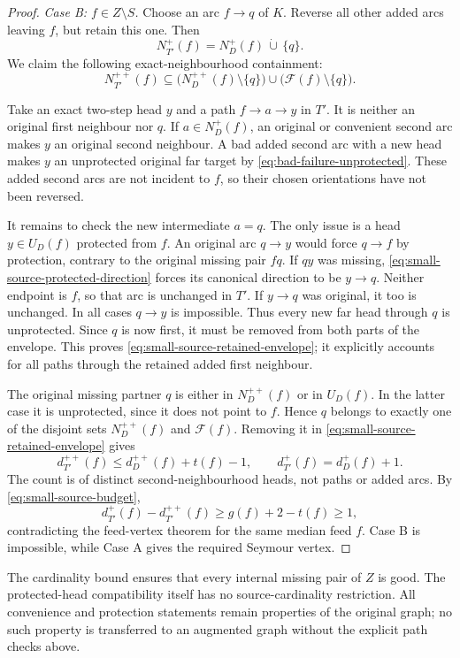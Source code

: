 \begin{proof}
\emph{Case B: $f\in Z\setminus S$.}
Choose an arc $f\to q$ of $K$. Reverse all other added arcs leaving
$f$, but retain this one. Then
\[
 N_{T'}^+(f)=N_D^+(f)\,\dot\cup\,\{q\}.
 \tag{SF4}\label{eq:small-source-retained-first}
\]
We claim the following exact-neighbourhood containment:
\[
 N_{T'}^{++}(f)
 \subseteq
 \bigl(N_D^{++}(f)\setminus\{q\}\bigr)
 \cup\bigl(\mathcal F(f)\setminus\{q\}\bigr).
 \tag{SF5}\label{eq:small-source-retained-envelope}
\]

Take an exact two-step head $y$ and a path $f\to a\to y$ in $T'$.
It is neither an original first neighbour nor $q$. If
$a\in N_D^+(f)$, an original or convenient second arc makes $y$
an original second neighbour. A bad added second arc with a new
head makes $y$ an unprotected original far target by
\eqref{eq:bad-failure-unprotected}. These added second arcs are not
incident to $f$, so their chosen orientations have not been reversed.

It remains to check the new intermediate $a=q$. The only issue is
a head $y\in U_D(f)$ protected from $f$. An original arc $q\to y$
would force $q\to f$ by protection, contrary to the original missing
pair $fq$. If $qy$ was missing, \eqref{eq:small-source-protected-direction}
forces its canonical direction to be $y\to q$. Neither endpoint
is $f$, so that arc is unchanged in $T'$. If $y\to q$ was original,
it too is unchanged. In all cases $q\to y$ is impossible. Thus every
new far head through $q$ is unprotected. Since $q$ is now first,
it must be removed from both parts of the envelope. This proves
\eqref{eq:small-source-retained-envelope}; it explicitly accounts
for all paths through the retained added first neighbour.

The original missing partner $q$ is either in $N_D^{++}(f)$ or in
$U_D(f)$. In the latter case it is unprotected, since it does not
point to $f$. Hence $q$ belongs to exactly one of the disjoint sets
$N_D^{++}(f)$ and $\mathcal F(f)$. Removing it in
\eqref{eq:small-source-retained-envelope} gives
\[
 d_{T'}^{++}(f)\le d_D^{++}(f)+t(f)-1,
 \qquad d_{T'}^+(f)=d_D^+(f)+1.
\]
The count is of distinct second-neighbourhood heads, not paths or
added arcs. By \eqref{eq:small-source-budget},
\[
 d_{T'}^+(f)-d_{T'}^{++}(f)
 \ge g(f)+2-t(f)\ge1,
\]
contradicting the feed-vertex theorem for the same median feed $f$.
Case B is impossible, while Case A gives the required Seymour vertex.
\end{proof}

The cardinality bound ensures that every internal missing pair of $Z$ is good. The protected-head compatibility itself has no source-cardinality restriction. All convenience and protection statements remain properties of the
original graph; no such property is transferred to an augmented graph
without the explicit path checks above.

